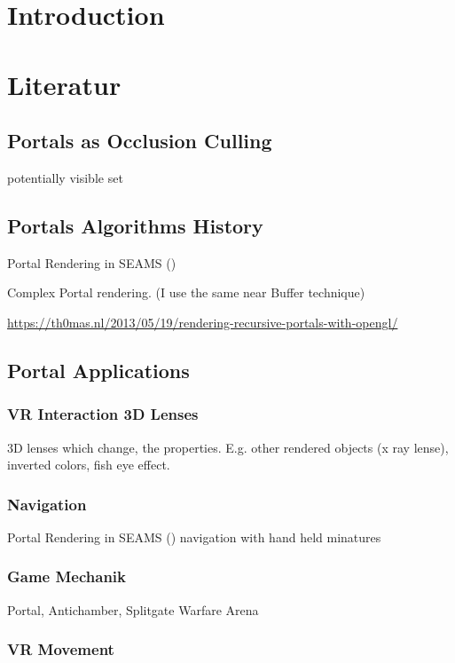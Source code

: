 \section{Introduction}

\section{Literatur}

\subsection{Portals as Occlusion Culling}
potentially visible set
\cite{luebke:1995:portals}
\cite{yang:2014:walkthrough}

\subsection{Portals Algorithms History}


Portal Rendering in SEAMS (\cite{schmalstieg:1999:sewing})

Complex Portal rendering. (I use the same near Buffer technique) \cite{ lowe:2005:technique}


\url{https://th0mas.nl/2013/05/19/rendering-recursive-portals-with-opengl/}
\subsection{Portal Applications}


\subsubsection{VR Interaction 3D Lenses}
\cite{borst:2009:real}
3D lenses which change, the properties. E.g. other rendered objects (x ray lense), inverted colors, fish eye effect.

\subsubsection{Navigation}
Portal Rendering in SEAMS (\cite{schmalstieg:1999:sewing})
\cite{pausch:1995:navigation} navigation with hand held minatures


\subsubsection{Game Mechanik}
Portal, Antichamber, Splitgate Warfare Arena

\subsubsection{VR Movement}

